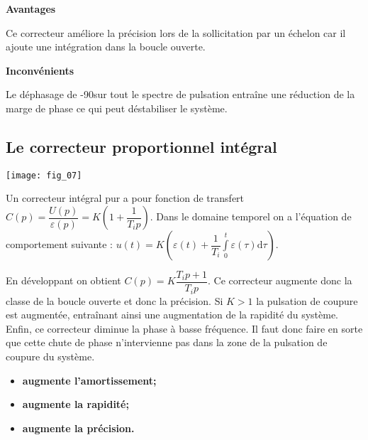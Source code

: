 \begin{resultat} 

\begin{multicols}{2}
\begin{center}
\textbf{Avantages}
\end{center}
Ce correcteur améliore la précision lors de la sollicitation par un échelon car il ajoute une intégration dans la boucle ouverte. 
\begin{center}
\textbf{Inconvénients}
\end{center}
Le déphasage de -90\degres sur tout le spectre de pulsation entraîne une réduction de la marge de phase ce qui peut déstabiliser le système. 
\end{multicols}
\end{resultat}

\subsection{Le correcteur proportionnel intégral}
\begin{marginfigure}
\texttt{[image: fig\_07]}
\end{marginfigure}

\begin{defi}[Correcteur PI]
Un correcteur intégral pur a pour fonction de transfert $C(p)=\dfrac{U(p)}{\varepsilon(p)}=K\left( 1+\dfrac{1}{T_i p}\right)$.
Dans le domaine temporel on a l'équation de comportement suivante : $u(t)=K\left(\varepsilon(t)+\dfrac{1}{T_i}\int\limits_0^t \varepsilon (\tau)\text{d}\tau\right)$.
\end{defi}

En développant on obtient $C(p)=K\dfrac{T_i p+1}{T_i p}$. Ce correcteur augmente donc la classe de la boucle ouverte et donc la précision. Si $K>1$ la pulsation de coupure est augmentée, entraînant ainsi une augmentation de la rapidité du système. Enfin, ce correcteur diminue la phase à basse fréquence. Il faut donc faire en sorte que cette chute de phase n'intervienne pas dans la zone de la pulsation de coupure du système.

\begin{resultat}[Correcteur PI]
\begin{itemize}
\item \textbf{augmente l'amortissement;}
\item \textbf{augmente la rapidité;}
\item \textbf{augmente la précision.} 
\end{itemize}

\end{resultat}



